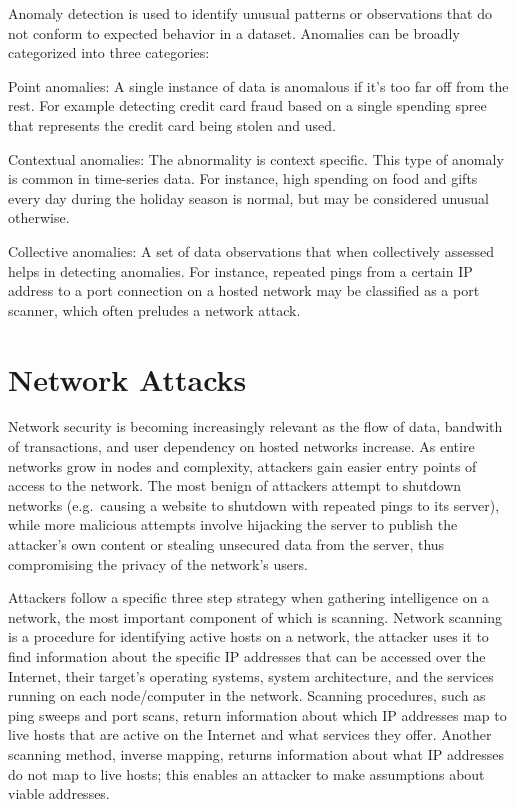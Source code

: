 \documentclass[12pt,twoside]{dukestatscithesis}
\theoremstyle{definition}
\theoremstyle{definition}
\theoremstyle{definition}
\theoremstyle{remark}
\begin{document}
Anomaly detection is used to identify unusual patterns or observations
that do not conform to expected behavior in a dataset. Anomalies can be
broadly categorized into three categories:

Point anomalies: A single instance of data is anomalous if it's too far
off from the rest. For example detecting credit card fraud based on a
single spending spree that represents the credit card being stolen and
used.

Contextual anomalies: The abnormality is context specific. This type of
anomaly is common in time-series data. For instance, high spending on
food and gifts every day during the holiday season is normal, but may be
considered unusual otherwise.

Collective anomalies: A set of data observations that when collectively
assessed helps in detecting anomalies. For instance, repeated pings from
a certain IP address to a port connection on a hosted network may be
classified as a port scanner, which often preludes a network attack.

\section{Network Attacks}\label{network-attacks}

Network security is becoming increasingly relevant as the flow of data,
bandwith of transactions, and user dependency on hosted networks
increase. As entire networks grow in nodes and complexity, attackers
gain easier entry points of access to the network. The most benign of
attackers attempt to shutdown networks (e.g.~causing a website to
shutdown with repeated pings to its server), while more malicious
attempts involve hijacking the server to publish the attacker's own
content or stealing unsecured data from the server, thus compromising
the privacy of the network's users.

Attackers follow a specific three step strategy when gathering
intelligence on a network, the most important component of which is
scanning. Network scanning is a procedure for identifying active hosts
on a network, the attacker uses it to find information about the
specific IP addresses that can be accessed over the Internet, their
target's operating systems, system architecture, and the services
running on each node/computer in the network. Scanning procedures, such
as ping sweeps and port scans, return information about which IP
addresses map to live hosts that are active on the Internet and what
services they offer. Another scanning method, inverse mapping, returns
information about what IP addresses do not map to live hosts; this
enables an attacker to make assumptions about viable addresses.
\end{document}
